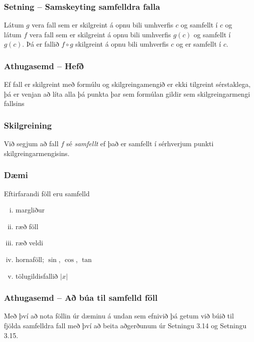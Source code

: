 \documentclass[icelandic,a4paper,12pt]{article}
\begin{document}
\subsubsection{Setning -- Samskeyting samfelldra falla}
Látum $g$ vera fall sem er skilgreint á opnu bili umhverfis $c$ og
samfellt í $c$ og látum $f$ vera fall sem er skilgreint á opnu bili
umhverfis $g(c)$ og samfellt í $g(c)$.  Þá er fallið $f\circ g$
skilgreint á opnu bili umhverfis $c$ og er samfellt í $c$.  
% 
 


\subsubsection{Athugasemd -- Hefð}
Ef fall er skilgreint með formúlu og skilgreingamengið er ekki
tilgreint sérstaklega, þá er venjan að líta alla þá punkta þar
sem formúlan gildir sem skilgreingarmengi fallsins
 
\subsubsection{Skilgreining}\label{skilgr:samfellt_fall}
 Við segjum að fall $f$ sé \emph{samfellt} ef það er samfellt í sérhverjum
punkti skilgreingarmengisins.

\subsubsection{Dæmi}
Eftirfarandi föll eru samfelld
\begin{enumerate}[(i)] 
\pause
  \item margliður
\pause
  \item ræð föll
\pause
  \item ræð veldi
\pause
  \item hornaföll; $\sin$, $\cos$, $\tan$
\pause
  \item tölugildisfallið $|x|$
\end{enumerate}

\subsubsection{Athugasemd -- Að búa til samfelld föll}
Með því að nota föllin úr dæminu á undan sem efnivið þá getum við búið til 
fjölda samfelldra fall með því að beita aðgerðunum úr Setningu 3.14 og 
Setningu 3.15.
\end{document}
